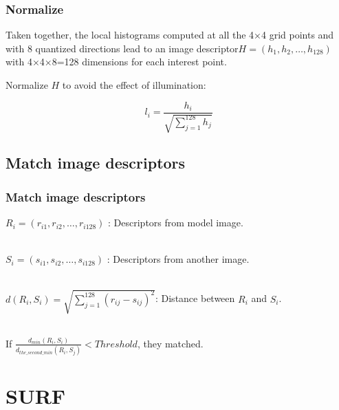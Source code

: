 \documentclass[notheorems, serif, table, compress]{beamer}  %
\begin{document}
\begin{frame}[fragile]
\frametitle{Normalize}%
Taken together, the local histograms computed at all the 4×4 grid points and with 8 quantized directions lead to an image descriptor$H=(h_{1},h_{2},\ldots,h_{128})$  with 4×4×8=128 dimensions for each interest point. 

Normalize $H$ to avoid the effect of illumination:

\begin{equation}
l_{i}=\frac{h_{i}}{\sqrt{\sum_{j=1}^{128}h_{j}}}
\end{equation}
   

\end{frame}

\subsection{Match image descriptors}
\begin{frame}[fragile]
\frametitle{Match image descriptors}%

$R_{i}=(r_{i1},r_{i2},\ldots,r_{i128})$ : Descriptors from model image.

\quad \\
$S_{i}=(s_{i1},s_{i2},\ldots,s_{i128})$ : Descriptors from another image.

\quad \\
$d(R_{i},S_{i})=\sqrt{\sum_{j=1}^{128}(r_{ij}-s_{ij})^{2}}$: Distance between $R_{i}$ and $S_{i}$.

\quad \\
If $\frac{d_{min}(R_{i},S_{i})}{d_{the\_second\_min}(R_{i},S_{j})}<Threshold$, they matched.

\end{frame}


\section{SURF}
\end{document}
